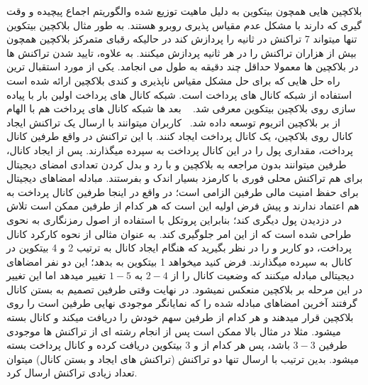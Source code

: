 


بلاکچین هایی همچون بیتکوین به دلیل ماهیت توزیع شده والگوریتم اجماع پیچیده و وقت گیری که دارند با مشکل عدم مقیاس پذیری روبرو هستند. به طور مثال بلاکچین بیتکوین تنها میتواند 7 تراکنش در ثانیه را پردازش کند در حالیکه رقبای متمرکز بلاکچین همچون  بیش از هزاران تراکنش را در هر ثانیه پردازش میکنند. به علاوه، تایید شدن تراکنش ها در بلاکچین ها معمولا حداقل چند دقیقه به طول می انجامد. یکی از مورد استقبال ترین راه حل هایی که برای حل مشکل مقیاس ناپذیری و کندی بلاکچین ارائه شده است استفاده از شبکه کانال های پرداخت است.
شبکه کانال های پرداخت اولین بار با پیاده سازی  روی بلاکچین بیتکوین معرفی شد.
~\cite{poon2015lightning}
بعد ها شبکه کانال های پرداخت  هم با الهام از  بر بلاکچین اتریوم توسعه داده شد.~\cite{raiden}
کاربران میتوانند با ارسال یک تراکنش ایجاد کانال  روی بلاکچین، یک کانال پرداخت ایجاد کنند. با این تراکنش در واقع طرفین کانال پرداخت، مقداری پول را در این کانال پرداخت به سپرده میگذارند. پس از ایجاد کانال، طرفین میتوانند بدون مراجعه به بلاکچین و با رد و بدل کردن تعدادی امضای دیجیتال برای هم تراکنش محلی فوری با کارمزد بسیار اندک و بفرستند. مبادله امضاهای دیجیتال برای حفظ امنیت مالی طرفین الزامی است؛ در واقع در اینجا طرفین کانال پرداخت به هم اعتماد ندارند و پیش فرض اولیه این است که هر کدام از طرفین ممکن است تلاش در دزدیدن پول دیگری کند؛ بنابراین پروتکل با استفاده از اصول رمزنگاری به نحوی طراحی شده است که از این امر جلوگیری کند. به عنوان مثالی از نحوه کارکرد کانال پرداخت، دو کاربر  و  را در نظر بگیرید که هنگام ایجاد کانال به ترتیب 2 و 4 بیتکوین در کانال به سپرده میگذارند. فرض کنید  میخواهد 1 بیتکوین به  بدهد؛ این دو نفر امضاهای دیجیتالی مبادله میکنند که وضعیت کانال را از 
$2-4$ 
به 
$1-5$ 
تغییر میدهد اما این تغییر در این مرحله بر بلاکچین منعکس نمیشود. در نهایت وقتی طرفین تصمیم به بستن کانال گرفتند آخرین امضاهای مبادله شده را که نمایانگر موجودی نهایی طرفین است را روی بلاکچین قرار میدهند و هر کدام از طرفین سهم خودش را دریافت میکند و کانال بسته میشود. مثلا در مثال بالا ممکن است پس از انجام رشته ای از تراکنش ها موجودی طرفین $3-3$ باشد، پس هر کدام از  و  3 بیتکوین دریافت کرده و کانال پرداخت بسته میشود. بدین ترتیب با ارسال تنها دو تراکنش (تراکنش های ایجاد و بستن کانال) میتوان تعداد زیادی تراکنش  ارسال کرد.

